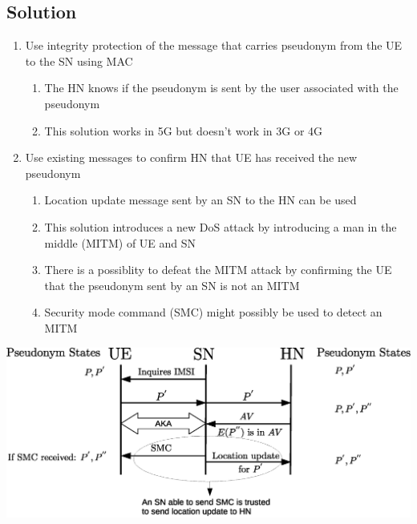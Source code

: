 \documentclass[portrait,a0]{a0poster}
\begin{document}
\begin{multicols}{2}
\section{Solution}
\begin{enumerate}
\item Use integrity protection of the message that carries pseudonym from the UE to the SN using MAC 
\begin{enumerate}
\item The HN knows if the pseudonym is sent by the user associated with the pseudonym
\item This solution works in 5G but doesn't work in 3G or 4G  
\end{enumerate}
\item Use existing messages to confirm HN that UE has received the new pseudonym
\begin{enumerate}
\item Location update message sent by an SN to the HN can be used 
\item This solution introduces a new DoS attack by introducing a man in the middle (MITM) of UE and SN
\item There is a possiblity to defeat the MITM attack by confirming the UE that the pseudonym sent by an SN is not an MITM
\item Security mode command (SMC) might possibly be used to detect an MITM
\end{enumerate}
\end{enumerate}

\begin{center}
\begin{minipage}[t]{0.9\linewidth} %
\vspace{.5cm} %
\includegraphics[width=1\linewidth]{solution.eps}
\hspace{0pt}
\vspace{.5cm} %
\end{minipage} 
\end{center}





\end{multicols}

\vfill %

\begin{minipage}[t]{0.9\linewidth} %
\footnotesize
{}
\end{minipage}
\end{document}

